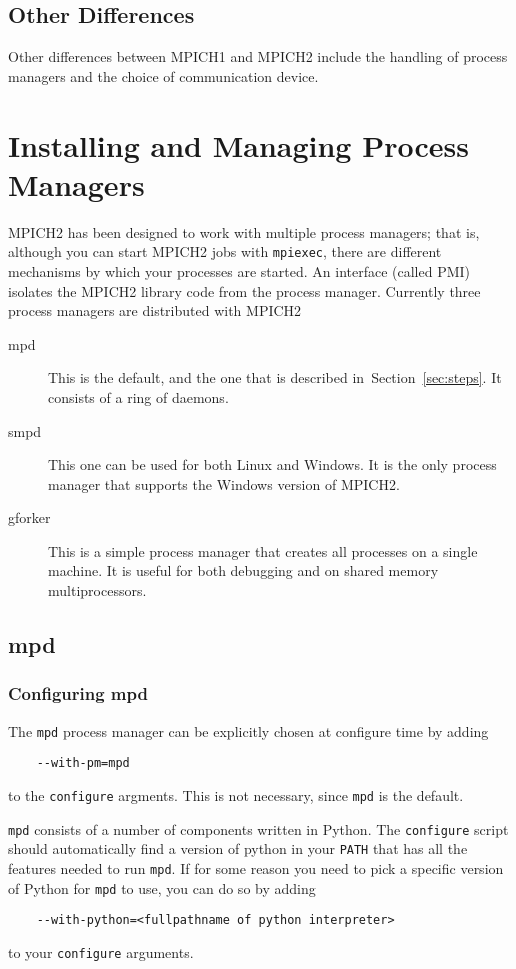 \documentclass[dvipdfm,11pt]{article}
\begin{document}
\subsection{Other Differences}
Other differences between MPICH1 and MPICH2 include the handling of
process managers and the choice of communication device.

\section{Installing and Managing Process Managers}
\label{sec:process-managers}
MPICH2 has been designed to work with multiple process managers; that
is, although you can start MPICH2 jobs with \texttt{mpiexec}, there are
different mechanisms by which your processes are started.  An interface
(called PMI) isolates the MPICH2 library code from the process manager.
Currently three process managers are distributed with MPICH2
\begin{description}
\item[mpd] This is the default, and the one that is described
  in~Section~\ref{sec:steps}.  It consists of a ring of daemons.
\item[smpd] This one can be used for both Linux and Windows.  It is the
  only process manager that supports the Windows version of MPICH2.
\item[gforker] This is a simple process manager that creates all
  processes on a single machine.  It is useful for both debugging and on
  shared memory multiprocessors.
\end{description}

\subsection{mpd}
\label{sec:mpd}

\subsubsection{Configuring mpd}
\label{sec:configuring-mpd}

The \texttt{mpd} process manager can be explicitly chosen at configure
time by adding
\begin{verbatim}
    --with-pm=mpd
\end{verbatim}
to the \texttt{configure} argments.  This is not necessary, since
\texttt{mpd} is the default.

\texttt{mpd} consists of a number of components written in Python.
The \texttt{configure} script should automatically find a version of
python in your \texttt{PATH} that has all the features needed to run
\texttt{mpd}.  If for some reason you need to pick a specific version of
Python for \texttt{mpd} to use, you can do so by adding
\begin{verbatim}
    --with-python=<fullpathname of python interpreter>
\end{verbatim}
to your \texttt{configure} arguments.
\end{document}
